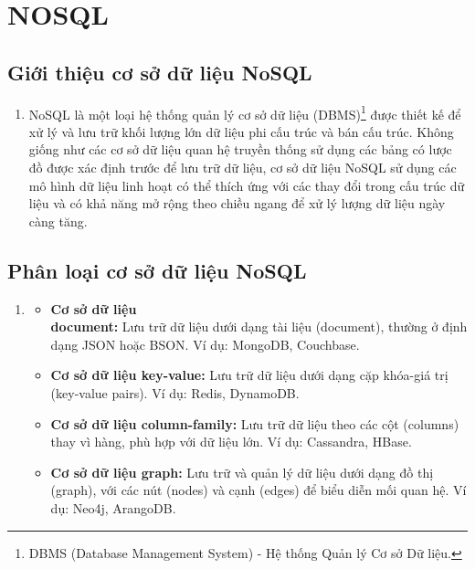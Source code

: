 \section{NOSQL}
\subsection{Giới thiệu cơ sở dữ liệu NoSQL}
\begin{enumerate}
    \item [] \hspace*{0.7cm}NoSQL là một loại hệ thống quản lý cơ sở dữ liệu (DBMS)\footnote{DBMS (Database Management System) - Hệ thống Quản lý Cơ sở Dữ liệu.} được thiết kế để xử lý và lưu trữ khối lượng lớn dữ liệu phi cấu trúc và bán cấu trúc. Không giống như các cơ sở dữ liệu quan hệ truyền thống sử dụng các bảng có lược đồ được xác định trước để lưu trữ dữ liệu, cơ sở dữ liệu NoSQL sử dụng các mô hình dữ liệu linh hoạt có thể thích ứng với các thay đổi trong cấu trúc dữ liệu và có khả năng mở rộng theo chiều ngang để xử lý lượng dữ liệu ngày càng tăng.\cite{noauthor_introduction_2018}

\end{enumerate}

\subsection{Phân loại cơ sở dữ liệu NoSQL}
\begin{enumerate}
    \item []
    \begin{itemize}[left=0.2cm]
    \item[-]\textbf{Cơ sở dữ liệu \\document:} Lưu trữ dữ liệu dưới dạng tài liệu (document), thường ở định dạng JSON hoặc BSON. Ví dụ: MongoDB, Couchbase.

    \item[-]\textbf{Cơ sở dữ liệu key-value:} Lưu trữ dữ liệu dưới dạng cặp khóa-giá trị (key-value pairs). Ví dụ: Redis, DynamoDB.
    
    \item[-]\textbf{Cơ sở dữ liệu column-family:} Lưu trữ dữ liệu theo các cột (columns) thay vì hàng, phù hợp với dữ liệu lớn. Ví dụ: Cassandra, HBase.
    
    \item[-]\textbf{Cơ sở dữ liệu graph:} Lưu trữ và quản lý dữ liệu dưới dạng đồ thị (graph), với các nút (nodes) và cạnh (edges) để biểu diễn mối quan hệ. Ví dụ: Neo4j, ArangoDB.
    \end{itemize}
    

\end{enumerate}

